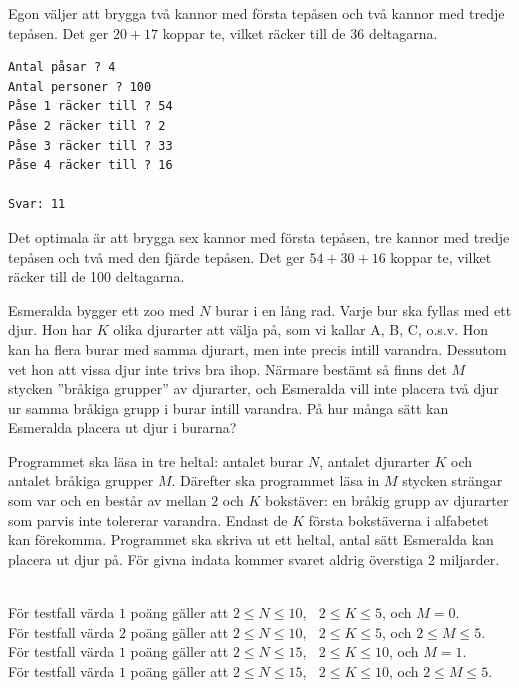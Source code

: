  Egon väljer att brygga två kannor med första tepåsen 
och två kannor med tredje tepåsen. Det ger $20+17$ koppar te, vilket
räcker till de 36 deltagarna.


\begin{verbatim}
Antal påsar ? 4
Antal personer ? 100
Påse 1 räcker till ? 54
Påse 2 räcker till ? 2
Påse 3 räcker till ? 33
Påse 4 räcker till ? 16

Svar: 11
\end{verbatim}


 Det optimala är att brygga sex kannor med första tepåsen,
tre kannor med tredje tepåsen och två med den fjärde tepåsen.
Det ger $54+30+16$ koppar te, vilket räcker till de 100  deltagarna.


\newpage
{}

Esmeralda bygger ett zoo med $N$ burar i en lång rad. Varje bur ska fyllas med ett djur. Hon har $K$ olika djurarter att välja på, som vi kallar A, B, C, o.s.v. Hon kan ha flera burar med samma djurart, men inte precis intill varandra. Dessutom vet hon att vissa djur inte trivs bra ihop. Närmare bestämt så finns det $M$ stycken ''bråkiga grupper'' av djurarter, och Esmeralda vill inte placera två djur ur samma bråkiga grupp i burar intill varandra. På hur många sätt kan Esmeralda placera ut djur i burarna?

Programmet ska läsa in tre heltal: antalet burar $N$, antalet djurarter $K$ och antalet bråkiga grupper $M$. Därefter ska programmet läsa in $M$ stycken strängar som var och en består av mellan $2$ och $K$ bokstäver: en bråkig grupp av djurarter som parvis inte tolererar varandra. Endast de $K$ första bokstäverna i alfabetet kan förekomma. Programmet ska skriva ut ett heltal, antal sätt Esmeralda kan placera ut djur på. För givna indata kommer svaret aldrig överstiga 2 miljarder.

\\
För testfall värda $1$ poäng gäller att $2\le N \le 10$, $\;\;2\le K \le 5$, och $M=0$. \\
För testfall värda $2$ poäng gäller att $2\le N \le 10$, $\;\;2\le K \le 5$, och $2 \le M\le 5$. \\
För testfall värda $1$ poäng gäller att $2\le N \le 15$, $\;\;2\le K \le 10$, och $M=1$. \\
För testfall värda $1$ poäng gäller att $2\le N \le 15$, $\;\;2\le K \le 10$, och $2 \le M\le 5$. \\


